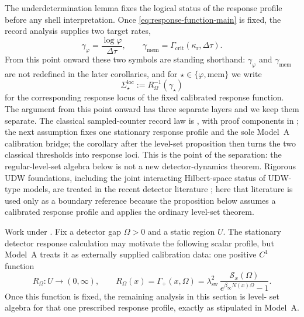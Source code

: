 The underdetermination lemma fixes the logical status of the response profile
before any shell interpretation. Once \eqref{eq:response-function-main} is
fixed, the record analysis supplies two target rates,
\begin{equation}\label{eq:target-rates-main}
\gamma_\varphi=\frac{\log\varphi}{\Delta\tau},
\qquad
\gamma_{\mathrm{mem}}=\Gamma_{\mathrm{crit}}(\kappa_{\mathrm r},\Delta\tau).
\end{equation}
From this point onward these two symbols are standing shorthand:
$\gamma_\varphi$ and $\gamma_{\mathrm{mem}}$ are not redefined in the later
corollaries, and for $\star\in\{\varphi,\mathrm{mem}\}$ we write
\[
\Sigma_\star^{\mathrm{loc}}:=R_\Omega^{-1}(\gamma_\star)
\]
for the corresponding response locus of the fixed calibrated response function.
The argument from this point onward has three separate layers and we keep
them separate. The classical sampled-counter record law is
, with proof components in
; the next assumption fixes one stationary response
profile and the sole Model~A calibration bridge; the corollary after the
level-set proposition then turns the two classical thresholds into response loci.
This is the point of the separation: the regular-level-set algebra below is
not a new detector-dynamics theorem.  Rigorous UDW foundations, including the
joint interacting Hilbert-space status of UDW-type models, are treated in the
recent detector literature \cite{TjoaGray2024UDWJointHilbert}; here that
literature is used only as a boundary reference because the proposition below
assumes a calibrated response profile and applies the ordinary level-set
theorem.

\begin{assumption}\label{ass:udw-rate-calibration-main}
\leavevmode\par\smallskip
\noindent{}

Work under . Fix a detector gap $\Omega>0$ and a
static region $U$. The stationary detector response calculation may motivate
the following scalar profile, but Model~A treats it as externally supplied
calibration data: one positive $C^1$ function
\[
R_\Omega:U\to(0,\infty),
\qquad
R_\Omega(x)=\Gamma_+(x,\Omega)
=\lambda_{\mathrm{sw}}^2\,
\frac{\mathcal S_x(\Omega)}{e^{\beta_\infty N(x)\Omega}-1}.
\]
Once this function is fixed, the remaining analysis in this section is level-
set algebra for that one prescribed response profile, exactly as stipulated in
Model~A.
\end{assumption}


